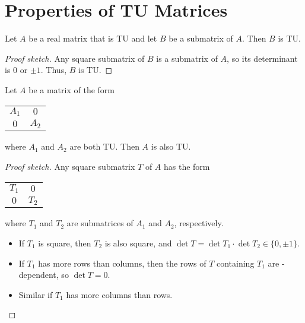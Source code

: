 \section{Properties of TU Matrices}

\begin{lemma}
  \label{lem:code_submatrix_of_tu}
  Let $A$ be a real matrix that is TU and let $B$ be a submatrix of $A$. Then $B$ is TU.
\end{lemma}

\begin{proof}[Proof sketch]
  Any square submatrix of $B$ is a submatrix of $A$, so its determinant is $0$ or $\pm 1$. Thus, $B$ is TU.
\end{proof}

\begin{lemma}
  \label{lem:code_diagonal_with_tu_blocks}
  Let $A$ be a matrix of the form
  \begin{tabular}{cc}
    \cline{1-2}
    \multicolumn{1}{|c|}{$A_{1}$} & \multicolumn{1}{c|}{    $0$} \\ \cline{1-2}
    \multicolumn{1}{|c|}{    $0$} & \multicolumn{1}{c|}{$A_{2}$} \\ \cline{1-2}
  \end{tabular}
  where $A_{1}$ and $A_{2}$ are both TU. Then $A$ is also TU.
\end{lemma}

\begin{proof}[Proof sketch]
  Any square submatrix $T$ of $A$ has the form
  \begin{tabular}{cc}
    \cline{1-2}
    \multicolumn{1}{|c|}{$T_{1}$} & \multicolumn{1}{c|}{    $0$} \\ \cline{1-2}
    \multicolumn{1}{|c|}{    $0$} & \multicolumn{1}{c|}{$T_{2}$} \\ \cline{1-2}
  \end{tabular}
  where $T_{1}$ and $T_{2}$ are submatrices of $A_{1}$ and $A_{2}$, respectively.
  \begin{itemize}
    \item If $T_{1}$ is square, then $T_{2}$ is also square, and $\det T = \det T_{1} \cdot \det T_{2} \in \{0, \pm 1\}$.
    \item If $T_{1}$ has more rows than columns, then the rows of $T$ containing $T_{1}$ are \GFtwo-dependent, so $\det T = 0$.
    \item Similar if $T_{1}$ has more columns than rows.
  \end{itemize}
\end{proof}

